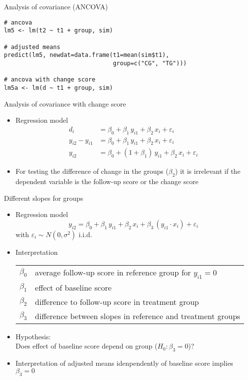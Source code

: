 \documentclass{beamer}
\begin{document}
{

\begin{frame}[fragile]{Analysis of covariance (ANCOVA)}
\begin{lstlisting}
# ancova
lm5 <- lm(t2 ~ t1 + group, sim)

# adjusted means
predict(lm5, newdat=data.frame(t1=mean(sim$t1), 
                               group=c("CG", "TG")))

# ancova with change score
lm5a <- lm(d ~ t1 + group, sim)

\end{lstlisting}
\end{frame}

}

\begin{frame}{Analysis of covariance with change score}
\begin{itemize}
  \item Regression model
    \begin{align*}
                  d_i &= \beta_0 + \beta_1 \, y_{i1} + \beta_2 \, x_i + \varepsilon_i \\
      y_{i2} - y_{i1} &= \beta_0 + \beta_1 \, y_{i1} + \beta_2 \, x_i + \varepsilon_i \\
               y_{i2} &= \beta_0 + (1 + \beta_1) \, y_{i1} + \beta_2 \, x_i + \varepsilon_i
    \end{align*}
  \item For testing the difference of change in the groups ($\beta_2$) it
    is irrelevant if the dependent variable is the follow-up score or the
    change score
  \vfill
\end{itemize}
\end{frame}

\begin{frame}{Different slopes for groups}
\begin{itemize}
  \item Regression model
    \[
      y_{i2} = \beta_0 + \beta_1 \, y_{i1} + \beta_2 \, x_i +
               \beta_3 \, (y_{i1} \cdot x_i) + \varepsilon_i
    \]
    with $\varepsilon_i \sim N(0, \sigma^2)$ i.i.d.
  \item Interpretation
    \begin{tabular}{lp{10cm}}
    $\beta_0$ & average follow-up score in reference group for $y_{i1} = 0$\\
    $\beta_1$ & effect of baseline score\\
    $\beta_2$ & difference to follow-up score in treatment group\\
    $\beta_3$ & difference between slopes in reference and treatment groups
    \end{tabular}
  \item Hypothesis:\\
        Does effect of baseline score depend on group ($H_0\colon \beta_3 = 0$)?
  \item Interpretation of adjusted means idenpendently of baseline score
    implies $\beta_3 = 0$
\end{itemize}
\end{frame}
\end{document}
